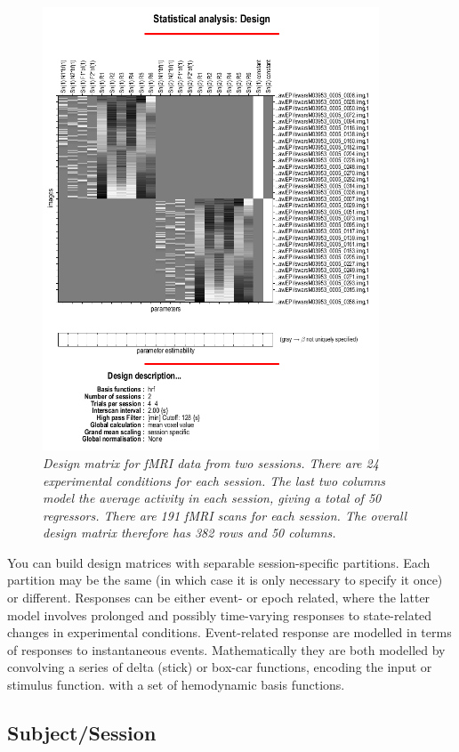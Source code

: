 \begin{figure}
\begin{center}
\includegraphics[width=100mm]{fmri_spec/design}
\end{center}
\caption{\em Design matrix for fMRI data from two sessions. There are 24 experimental conditions for each session. The last two columns model the average activity in each session, giving a total of 50 regressors. There are 191 fMRI scans for each session. The overall design matrix therefore has 382 rows and 50 columns. \label{design}}
\end{figure}

You can build design matrices with separable session-specific partitions.  Each partition may be the same (in which case it is only necessary to specify it once) or different.  Responses can be either event- or epoch related, where the latter model involves prolonged and possibly time-varying responses to state-related changes in experimental conditions.  Event-related response are modelled in terms of responses to instantaneous events.  Mathematically they are both modelled by convolving a series of delta (stick) or box-car functions, encoding the input or stimulus function. with a set of hemodynamic basis functions.

\subsection{Subject/Session}

